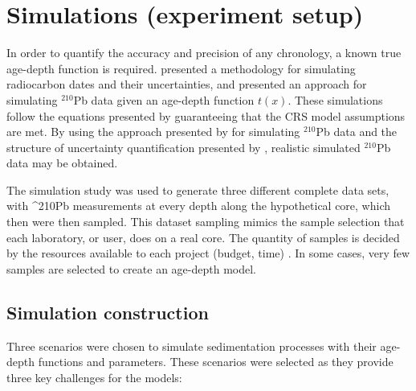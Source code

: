\documentclass [10pt] {article}
\begin{document}



\section{Simulations (experiment setup)}

	In order to quantify the accuracy and precision of any chronology, a known true age-depth function is required.
\citet{Blaauw2018} presented a methodology for simulating radiocarbon dates and their uncertainties, and \citet{Aquino2018} presented an approach for simulating $^{210}$Pb data given an age-depth function $t(x)$.
These simulations follow the equations presented by \cite{Appleby1978, Robbins1978} guaranteeing that the CRS model assumptions are met. 
By using the approach presented by \citet{Aquino2018} for simulating $^{210}$Pb data and the structure of uncertainty quantification presented by \citet{Blaauw2018}, realistic simulated $^{210}$Pb data may be obtained.

The simulation study was used to generate three different complete data sets, with ^210Pb measurements at every depth along the hypothetical core, which then were then sampled. This dataset sampling mimics the sample selection that each laboratory, or user, does on a real core. The quantity of samples is decided by the resources available to each project (budget, time) \citet{Blaauw2018}. 
In some cases, very few samples are selected to create an age-depth model.

\subsection{Simulation construction}\label{sec:SimConst}

Three scenarios were chosen to simulate sedimentation processes with their age-depth functions and parameters. These scenarios were selected as they provide three key challenges for the models:
\end{document}
